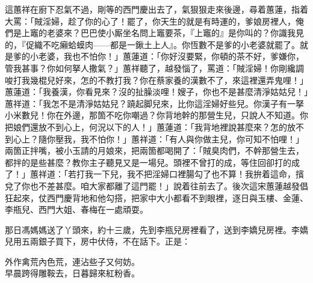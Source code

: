 這蕙祥在廚下忍氣不過，剛等的西門慶出去了，氣狠狠走來後邊，尋着蕙蓮，指着大罵：「賊淫婦，趁了你的心了！罷了，你天生的就是有時運的，爹娘房裡人，俺們是上竈的老婆來？巴巴使小厮坐名問上竈要茶，『上竈的』是你叫的？你識我見的，『促織不吃癩蛤蟆肉——都是一鍬土上人』。你恆數不是爹的小老婆就罷了。就是爹的小老婆，我也不怕你！」蕙蓮道：「你好沒要緊，你頓的茶不好，爹嫌你，管我甚事？你如何拏人撒氣？」蕙祥聽了，越發惱了，罵道：「賊淫婦！你剛纔調唆打我幾棍兒好來，怎的不教打我？你在蔡家養的漢數不了，來這裡還弄鬼哩！」蕙蓮道：「我養漢，你看見來？沒的扯臊淡哩！嫂子，你也不是甚麼清淨姑姑兒！」{}蕙祥道：「我怎不是清淨姑姑兒？蹺起脚兒來，比你這淫婦好些兒。{}你漢子有一拏小米數兒！你在外邊，那箇不吃你嘲過？你背地幹的那營生兒，只說人不知道。你把娘們還放不到心上，何況以下的人！」{}蕙蓮道：「我背地裡說甚麼來？怎的放不到心上？隨你壓我，我不怕你！」蕙祥道：「有人與你做主兒，你可知不怕哩！」兩箇正拌嘴，被小玉請的月娘來，把兩箇都喝開了：「賊臭肉們，不幹那營生去，都拌的是些甚麼？教你主子聽見又是一場兒。頭裡不曾打的成，等住回卻打的成了！」蕙祥道：「若打我一下兒，我不把淫婦口裡腸勾了也不算！我拚着這命，擯兌了你也不差甚麼。咱大家都離了這門罷！」說着往前去了。後次這宋蕙蓮越發倡狂起來，仗西門慶背地和他勾搭，把家中大小都看不到眼裡，逐日與玉樓、金蓮、李瓶兒、西門大姐、春梅在一處頑耍。

那日馮媽媽送了丫頭來，約十三歲，先到李瓶兒房裡看了，送到李嬌兒房裡。李嬌兒用五兩銀子買下，房中伏侍，不在話下。正是：

\begin{myquote} 
外作禽荒內色荒，連沾些子又何妨。\\早晨跨得雕鞍去，日暮歸來紅粉香。
\end{myquote} 

